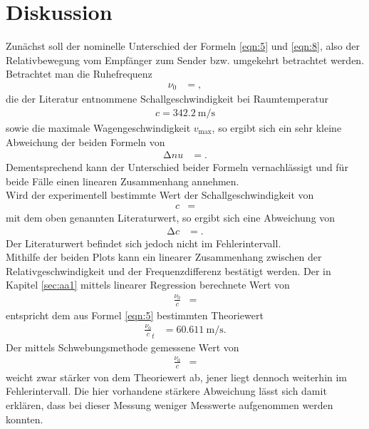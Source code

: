 \section{Diskussion}
\label{sec:Diskussion}
Zunächst soll der nominelle Unterschied der Formeln \ref{eqn:5} und \ref{eqn:8}, also der Relativbewegung vom Empfänger zum Sender bzw. umgekehrt betrachtet werden.
Betrachtet man die Ruhefrequenz
\begin{align*}
  \nu_0 &= ,
\end{align*}
die der Literatur entnommene Schallgeschwindigkeit bei Raumtemperatur
\begin{align*}
  c = \SI{342.2}{\metre\per\second}
\end{align*}
sowie die maximale Wagengeschwindigkeit $v_{\text{max}}$, so ergibt sich ein sehr kleine Abweichung der beiden Formeln von
\begin{align*}
  \increment{nu} &= .
\end{align*}
Dementsprechend kann der Unterschied beider Formeln vernachlässigt und für beide Fälle einen linearen Zusammenhang annehmen.\\
Wird der experimentell bestimmte Wert der Schallgeschwindigkeit von
\begin{align*}
  c &= 
\end{align*}
mit dem oben genannten Literaturwert, so ergibt sich eine Abweichung von
\begin{align*}
  \increment{c} &= .
\end{align*}
Der Literaturwert befindet sich jedoch nicht im Fehlerintervall.\\
Mithilfe der beiden Plots kann ein linearer Zusammenhang zwischen der Relativgeschwindigkeit und der Frequenzdifferenz bestätigt werden.
Der in Kapitel \ref{sec:aa1} mittels linearer Regression berechnete Wert von
\begin{align*}
  \frac{\nu_0}{c} &= 
\end{align*}
entspricht dem aus Formel \ref{eqn:5} bestimmten Theoriewert
\begin{align*}
  \frac{\nu_0}{c}_t &= \SI{60.611}{\metre\per\second}.
\end{align*}
Der mittels Schwebungsmethode gemessene Wert von
\begin{align*}
  \frac{\nu_0}{c} &= 
\end{align*}
weicht zwar stärker von dem Theoriewert ab, jener liegt dennoch weiterhin im Fehlerintervall.
Die hier vorhandene stärkere Abweichung lässt sich damit erklären, dass bei dieser Messung weniger Messwerte aufgenommen werden konnten.
